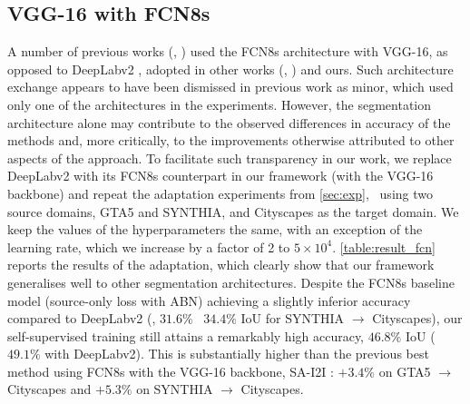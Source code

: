 \subsection{VGG-16 with FCN8s}
\label{sec:fcn}
A number of previous works (\eg, \cite{MustoZ20,Yang_2020_ECCV,0001S20}) used the FCN8s  architecture with VGG-16, as opposed to DeepLabv2 \cite{ChenPKMY18}, adopted in other works (\eg, \cite{KimB20a,Wang_2020_ECCV}) and ours.
Such architecture exchange appears to have been dismissed in previous work as minor, which used only one of the architectures in the experiments.
However, the segmentation architecture alone may contribute to the observed differences in accuracy of the methods and, more critically, to the improvements otherwise attributed to other aspects of the approach.
To facilitate such transparency in our work, we replace DeepLabv2 with its FCN8s counterpart in our framework (with the VGG-16 backbone) and repeat the adaptation experiments from \cref{sec:exp}, \ie~using two source domains, GTA5 and SYNTHIA, and Cityscapes as the target domain.
We keep the values of the hyperparameters the same, with an exception of the learning rate, which we increase by a factor of \num{2} to $5\times 10^4$.
\cref{table:result_fcn} reports the results of the adaptation, which clearly show that our framework generalises well to other segmentation architectures.
Despite the FCN8s baseline model (source-only loss with ABN) achieving a slightly inferior accuracy compared to DeepLabv2 (\eg, $31.6\%$ \vs~$34.4\%$ IoU for SYNTHIA $\rightarrow$ Cityscapes), our self-supervised training still attains a remarkably high accuracy, $46.8\%$ IoU (\vs~$49.1\%$ with DeepLabv2).
This is substantially higher than the previous best method using FCN8s with the VGG-16 backbone, SA-I2I \cite{MustoZ20}: $+3.4\%$ on GTA5 $\rightarrow$ Cityscapes and $+5.3\%$ on SYNTHIA $\rightarrow$ Cityscapes.
